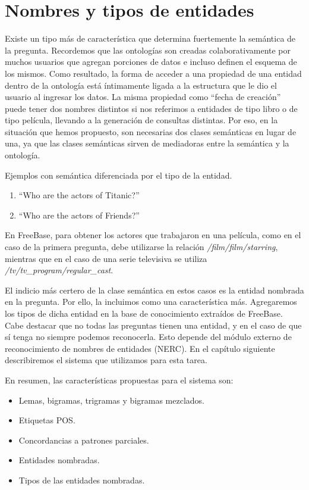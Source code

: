\section{Nombres y tipos de entidades}

Existe un tipo más de característica que determina fuertemente la semántica de la pregunta. Recordemos que las ontologías son creadas colaborativamente por muchos usuarios que agregan porciones de datos e incluso definen el esquema de los mismos. Como resultado, la forma de acceder a una propiedad de una entidad dentro de la ontología está íntimamente ligada a la estructura que le dio el usuario al ingresar los datos. La misma propiedad como ``fecha de creación'' puede tener dos nombres distintos si nos referimos a entidades de tipo libro o de tipo película, llevando a la generación de consultas distintas. Por eso, en la situación que hemos propuesto, son necesarias dos clases semánticas en lugar de una, ya que las clases semánticas sirven de mediadoras entre la semántica y la ontología.

\begin{example} Ejemplos con semántica diferenciada por el tipo de la entidad.
    \begin{enumerate}
        \item ``Who are the actors of Titanic?''
        \item ``Who are the actors of Friends?''
    \end{enumerate}
En FreeBase, para obtener los actores que trabajaron en una película, como en el caso de la primera pregunta, debe utilizarse la relación \textit{/film/film/starring}, mientras que en el caso de una serie televisiva se utiliza \textit{/tv/tv\_program/regular\_cast}.
\end{example}

El indicio más certero de la clase semántica en estos casos es la entidad nombrada en la pregunta. Por ello, la incluimos como una característica más. Agregaremos los tipos de dicha entidad en la base de conocimiento extraídos de FreeBase. Cabe destacar que no todas las preguntas tienen una entidad, y en el caso de que sí tenga no siempre podemos reconocerla. Esto depende del módulo externo de reconocimiento de nombres de entidades (NERC). En el capítulo siguiente describiremos el sistema que utilizamos para esta tarea.

En resumen, las características propuestas para el sistema son:
\begin{itemize}
    \item Lemas, bigramas, trigramas y bigramas mezclados.
    \item Etiquetas POS.
    \item Concordancias a patrones parciales.
    \item Entidades nombradas.
    \item Tipos de las entidades nombradas.
\end{itemize}

